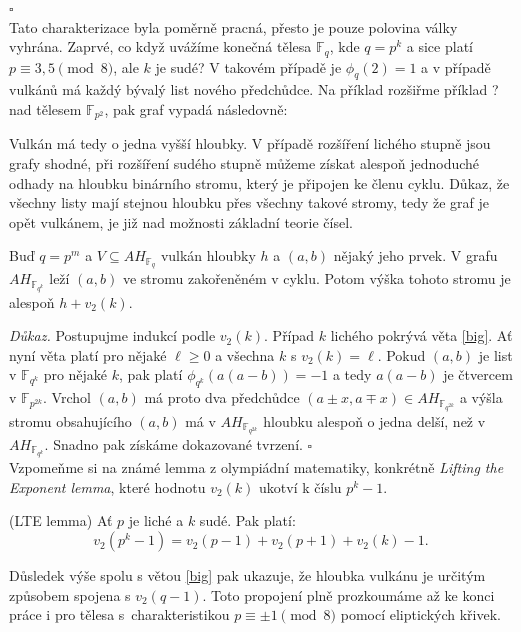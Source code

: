 \documentclass[12pt]{report}
\begin{document}
 \hfill $\square$\\
 
Tato charakterizace byla poměrně pracná, přesto je pouze polovina války vyhrána. Zaprvé, co když uvážíme konečná tělesa $\mathbb{F}_q$, kde $q = p^k$ a sice platí $p \equiv 3,5 \pmod{8}$, ale $k$ je sudé? V takovém případě je $\phi_q(2)=1$ a v případě vulkánů má každý bývalý list nového předchůdce. Na příklad rozšiřme příklad ? nad tělesem $\mathbb{F}_{p^2}$, pak graf vypadá následovně:

Vulkán má tedy o jedna vyšší hloubky. V případě rozšíření lichého stupně jsou grafy shodné, při rozšíření sudého stupně můžeme získat alespoň jednoduché odhady na hloubku binárního stromu, který je připojen ke členu cyklu. Důkaz, že všechny listy mají stejnou hloubku přes všechny takové stromy, tedy že graf je opět vulkánem, je již nad možnosti základní teorie čísel. 

\begin{dusledek}
Buď $q = p^m$ a $V \subseteq AH_{\mathbb{F}_q}$ vulkán hloubky $h$ a $(a,b)$ nějaký jeho prvek. V grafu $AH_{\mathbb{F}_{q^k}}$ leží $(a,b)$ ve stromu zakořeněném v cyklu. Potom výška tohoto stromu je alespoň $h+v_2(k)$.
\end{dusledek}
\noindent \textit{Důkaz.} Postupujme indukcí podle $v_2(k)$. Případ $k$ lichého pokrývá věta \ref{big}. Ať nyní věta platí pro nějaké $\ell \geqslant 0$ a všechna $k$ s $v_2 (k) = \ell$. Pokud $(a,b)$ je list v $\mathbb{F}_{q^k}$ pro nějaké $k$, pak platí $\phi_{q^k} (a(a-b)) = -1$ a tedy $a(a-b)$ je čtvercem v $\mathbb{F}_{p^{2k}}$. Vrchol $(a,b)$ má proto dva předchůdce $(a\pm x,a\mp x) \in AH_{\mathbb{F}_{q^{2k}}}$  a výšla stromu obsahujícího $(a,b)$ má v $AH_{\mathbb{F}_{q^{2k}}}$ hloubku alespoň o jedna delší, než v $AH_{\mathbb{F}_{q^{k}}}$. Snadno pak získáme dokazované tvrzení. \hfill $\square$\\

Vzpomeňme si na známé lemma z olympiádní matematiky, konkrétně \textit{Lifting the Exponent lemma}, které hodnotu $v_2(k)$ ukotví k číslu $p^k - 1$. 
\begin{veta}(LTE lemma)
Ať $p$ je liché a $k$ sudé. Pak platí:
$$v_2 (p^k - 1) = v_2(p-1)+v_2 (p+1) + v_2 (k) - 1.$$
\end{veta}
Důsledek výše spolu s větou \ref{big} pak ukazuje, že hloubka vulkánu je určitým způsobem spojena s $v_2 (q-1)$. Toto propojení plně prozkoumáme až ke konci práce i pro tělesa s~charakteristikou $p \equiv \pm 1 \pmod{8}$ pomocí eliptických křivek.
\end{document}
